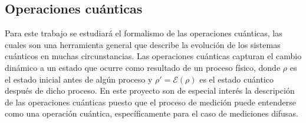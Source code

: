 

\subsection{Operaciones cuánticas}

Para este trabajo se estudiará el formalismo de las operaciones cuánticas, las cuales son una herramienta general que describe la evolución de los sistemas cuánticos en muchas circunstancias. Las operaciones cuánticas capturan el cambio dinámico a un estado que ocurre como resultado de un proceso físico, donde $\rho$ es el estado inicial antes de algún proceso y $\rho '=\mathcal{E}(\rho) $ es el estado cuántico después de dicho proceso. En este proyecto son de especial interés la descripción de las operaciones cuánticas puesto que el proceso de medición puede entenderse como una operación cuántica, específicamente para el caso de mediciones difusas. 






